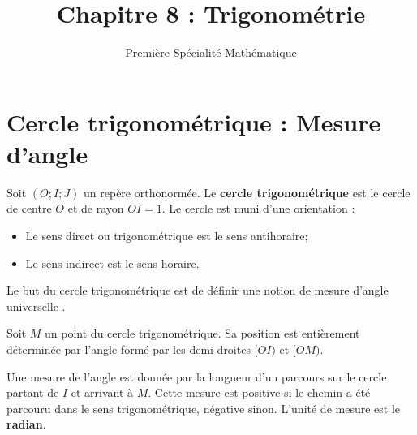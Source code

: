 \documentclass{poly}
\title{Chapitre 8 : Trigonométrie}
\author{Première Spécialité Mathématique}
\date{}
\begin{document}
\maketitle
\section{Cercle trigonométrique : Mesure d'angle}
\begin{definition}
Soit $(O;I;J)$ un repère orthonormée. Le \textbf{cercle trigonométrique} est le cercle de centre $O$ et de rayon $OI = 1$. Le cercle est muni d'une orientation :
\begin{itemize}
\item Le sens direct ou trigonométrique est le sens antihoraire;
\item Le sens indirect est le sens horaire.
\end{itemize}
\end{definition}
\begin{center}
\end{center}
\begin{remark}
Le but du cercle trigonométrique est de définir une notion de mesure d'angle \og universelle \fg.
\end{remark}
\newpage
\begin{definition}
Soit $M$ un point du cercle trigonométrique. Sa position est entièrement déterminée par l'angle formé par les demi-droites $[OI)$ et $[OM)$.

Une mesure de l'angle est donnée par la longueur d'un parcours sur le cercle partant de $I$ et arrivant à $M$. Cette mesure est positive si le chemin a été parcouru dans le sens trigonométrique, négative sinon. L'unité de mesure est le \textbf{radian}.
\end{definition}
\begin{center}
\end{center}
\end{document}
